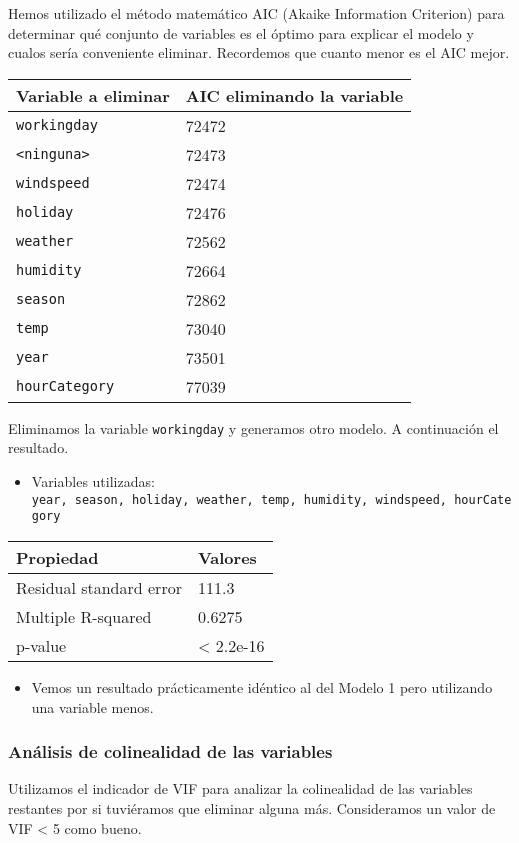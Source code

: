 \documentclass[
]{article}
\providecommand{\tightlist}{%
  \setlength{\itemsep}{0pt}\setlength{\parskip}{0pt}}
\begin{document}
Hemos utilizado el método matemático AIC (Akaike Information Criterion)
para determinar qué conjunto de variables es el óptimo para explicar el
modelo y cualos sería conveniente eliminar. Recordemos que cuanto menor
es el AIC mejor.

\begin{longtable}[]{@{}ll@{}}
\toprule
Variable a eliminar & AIC eliminando la variable\tabularnewline
\midrule
\endhead
\texttt{workingday} & 72472\tabularnewline
\texttt{\textless{}ninguna\textgreater{}} & 72473\tabularnewline
\texttt{windspeed} & 72474\tabularnewline
\texttt{holiday} & 72476\tabularnewline
\texttt{weather} & 72562\tabularnewline
\texttt{humidity} & 72664\tabularnewline
\texttt{season} & 72862\tabularnewline
\texttt{temp} & 73040\tabularnewline
\texttt{year} & 73501\tabularnewline
\texttt{hourCategory} & 77039\tabularnewline
\bottomrule
\end{longtable}

Eliminamos la variable \texttt{workingday} y generamos otro modelo. A
continuación el resultado.

\begin{itemize}
\tightlist
\item
  Variables utilizadas:
  \texttt{year,\ season,\ holiday,\ weather,\ temp,\ humidity,\ windspeed,\ hourCategory}
\end{itemize}

\begin{longtable}[]{@{}ll@{}}
\toprule
Propiedad & Valores\tabularnewline
\midrule
\endhead
Residual standard error & 111.3\tabularnewline
Multiple R-squared & 0.6275\tabularnewline
p-value & \textless{} 2.2e-16\tabularnewline
\bottomrule
\end{longtable}

\begin{itemize}
\tightlist
\item
  Vemos un resultado prácticamente idéntico al del Modelo 1 pero
  utilizando una variable menos.
\end{itemize}

\hypertarget{anuxe1lisis-de-colinealidad-de-las-variables}{%
\subsubsection{Análisis de colinealidad de las
variables}\label{anuxe1lisis-de-colinealidad-de-las-variables}}

Utilizamos el indicador de VIF para analizar la colinealidad de las
variables restantes por si tuviéramos que eliminar alguna más.
Consideramos un valor de VIF \textless{} 5 como bueno.
\end{document}

